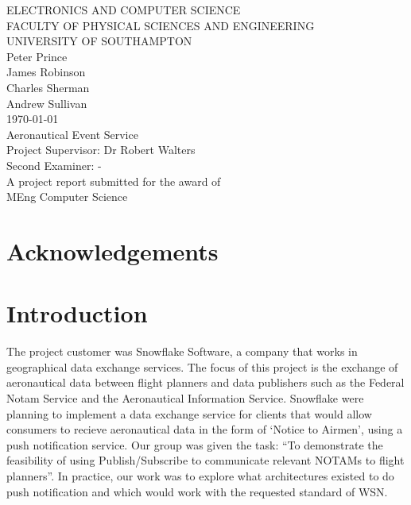 \documentclass[a4paper, 12pt]{article}
\begin{document}
\begin{titlepage}

	\center

	{\large ELECTRONICS AND COMPUTER SCIENCE}\\[0.2cm]
	{\large FACULTY OF PHYSICAL SCIENCES AND ENGINEERING}\\[0.2cm]
	{\large UNIVERSITY OF SOUTHAMPTON}\\[3cm]

	{\Large Peter Prince}\\[0.2cm]
	{\Large James Robinson}\\[0.2cm]
	{\Large Charles Sherman}\\[0.2cm]
	{\Large Andrew Sullivan}\\[1cm]
	{\Large \today}\\[3cm]

	{\LARGE Aeronautical Event Service}\\[3cm]

	{\large Project Supervisor: Dr Robert Walters}\\[0.2cm]
	{\large Second Examiner: -}\\[2.5cm]

	{\large A project report submitted for the award of}\\[0.2cm]
	{\Large MEng Computer Science}

\end{titlepage}

\begin{abstract}

\end{abstract}

\newpage

\section*{Acknowledgements}

\newpage

\tableofcontents
\newpage

\listoffigures
\newpage

\section{Introduction}
\label{sec:introduction}

The project customer was Snowflake Software, a company that works in geographical data exchange services. The focus of this project is the exchange of aeronautical data between flight planners and data publishers such as the Federal Notam Service and the Aeronautical Information Service. Snowflake were planning to implement a data exchange service for clients that would allow consumers to recieve aeronautical data in the form of `Notice to Airmen', using a push notification service. Our group was given the task: ``To demonstrate the feasibility of using Publish/Subscribe to communicate relevant NOTAMs to flight planners''. In practice, our work was to explore what architectures existed to do push notification and which would work with the requested standard of WSN.
\end{document}
